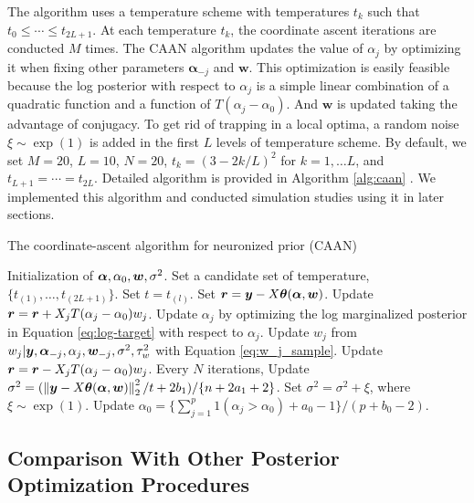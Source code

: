 The algorithm uses a temperature scheme with temperatures $t_k$ such that $t_0 \leq \cdots \leq t_{2L+1}$. At each temperature $t_k$, the coordinate ascent iterations are conducted $M$ times. The CAAN algorithm updates the value of $\alpha_j$ by optimizing it when fixing other parameters $\bm{\alpha}_{-j}$ and $\bm{w}$. This optimization is easily feasible because the log posterior with respect to $\alpha_j$ is a simple linear combination of a quadratic function and a function of $T(\alpha_j-\alpha_0)$. And $\bm{w}$ is updated taking the advantage of conjugacy. To get rid of trapping in a local optima, a random noise $\xi \sim \exp (1)$ is added in the first $L$ levels of temperature scheme. By default, we set $M=20$, $L=10$, $N=20$, $t_k = (3-2k/L)^2$ for $k= 1, \dots L$, and $ t_{L+1} = \cdots = t_{2L}$. Detailed algorithm is provided in Algorithm \ref{alg:caan} . We implemented this algorithm and conducted simulation studies using it in later sections.

\begin{algorithm}[H]
\caption{The coordinate-ascent algorithm for neuronized prior (CAAN)} \label{alg:caan}
\begin{algorithmic}
\Require Initialization of $\bm{\alpha},\alpha_0, \bm{w}, \sigma^2$.
\State Set a candidate set of temperature, $\{t_{(1)}, \dots, t_{(2L+1)}\}$.
\State Set $t = t_{(l)}$.
\State Set $\bm{r} = \bm{y} - X\bm{\theta}(\bm{\alpha},\bm{w})$.
\State Update $\bm{r} = \bm{r} + X_j T(\alpha_j - \alpha_0)w_j$.
\State Update $\alpha_j$ by optimizing the log marginalized posterior in Equation \eqref{eq:log-target} with respect to $\alpha_j$.
\State Update $w_j$ from $w_j | \bm{y}, \bm{\alpha}_{-j},\alpha_j, \bm{w}_{-j}, \sigma^2, \tau_w^2 $ with Equation \eqref{eq:w_j_sample}.
\State Update $\bm{r} = \bm{r} - X_jT(\alpha_j-\alpha_0) w_j$.
\EndFor
\State Every $N$ iterations,
\State  Update $\sigma^2 = (\left\lVert\bm{y}-X\bm{\theta}(\bm{\alpha},\bm{w})\right\rVert_2^2/t + 2b_1)/\{n+2a_1+2\}$.
    \State Set $\sigma^2 = \sigma^2 + \xi$, where $\xi \sim \exp(1)$.
\EndIf
\State  Update $\alpha_0 = \{\sum_{j=1}^p 1(\alpha_j > \alpha_0) + a_0 -1\}/ (p+b_0 -2).$
\EndFor
\EndFor
\end{algorithmic}
\end{algorithm}


\subsection{Comparison With Other Posterior Optimization Procedures}

